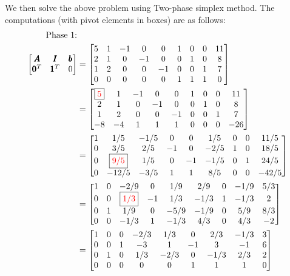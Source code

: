 \documentclass[11pt]{article}
\newcommand{\V}[1]{\pmb{#1}}
\begin{document}
\noindent We then solve the above problem using Two-phase simplex method. The computations (with pivot elements in boxes) are as follows:
\begin{align}
\text{Phase 1:}&\nonumber\\
%
\begin{bmatrix}
 \V{A}& \V{I}& \V{b}\\
 \V{0}^T& \V{1}^T& 0
\end{bmatrix}
% 
&=\begin{bmatrix}
5&	1&	-1&	0&	0&	1&	0&	0&	11\\
2&	1&	0&	-1&	0&	0&	1&	0&	8\\
1&	2&	0&	0&	-1&	0&	0&	1&	7\\
0&	0&	0&	0&	0&	1&	1&	1&	0
\end{bmatrix}\nonumber\\
% 
&=\begin{bmatrix}
\fbox{{\color{red}5}}&	1&	-1&	0&	0&	1&	0&	0&	11\\
2&	1&	0&	-1&	0&	0&	1&	0&	8\\
1&	2&	0&	0&	-1&	0&	0&	1&	7\\
-8&	-4&	1&	1&	1&	0&	0&	0&	-26
\end{bmatrix}\nonumber\\
% 
&=\begin{bmatrix}
1&	1/5&	-1/5&	0&	0&	1/5&	0&	0&	11/5\\
0&	3/5&	2/5&	-1&	0&	-2/5&	1&	0&	18/5\\
0&	\fbox{{\color{red}9/5}}&	1/5&	0&	-1&	-1/5&	0&	1&	24/5\\
0&	-12/5&	-3/5&	1&	1&	8/5&	0&	0&	-42/5
\end{bmatrix}\nonumber\\
% 
&=\begin{bmatrix}
1&	0&	-2/9&	0&	1/9&	2/9&	0&	-1/9&	5/3\\
0&	0&	\fbox{{\color{red}1/3}}&	-1&	1/3&	-1/3&	1&	-1/3&	2\\
0&	1&	1/9&	0&	-5/9&	-1/9&	0&	5/9&	8/3\\
0&	0&	-1/3&	1&	-1/3&	4/3&	0&	4/3&	-2
\end{bmatrix}\nonumber\\
% 
&=\begin{bmatrix}
1&	0&	0&	-2/3&	1/3&	0&	2/3&	-1/3&	3\\
0&	0&	1&	-3&	1&	-1&	3&	-1&	6\\
0&	1&	0&	1/3&	-2/3&	0&	-1/3&	2/3&	2\\
0&	0&	0&	0&	0&	1&	1&	1&	0
\end{bmatrix}\nonumber
\end{align}
\end{document}
